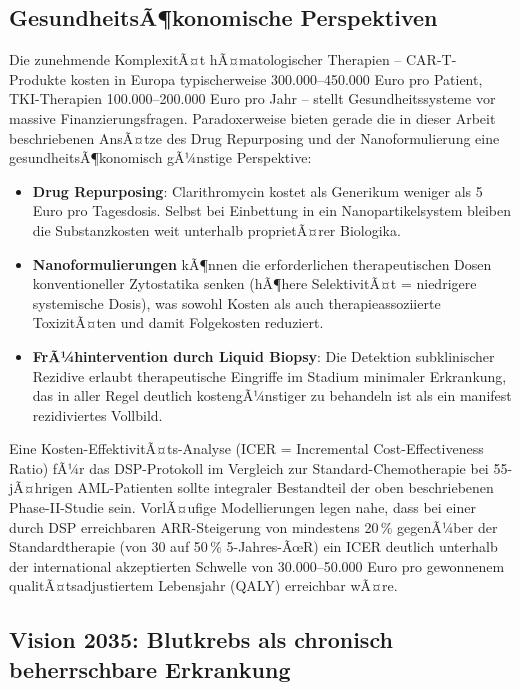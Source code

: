 ﻿\documentclass[12pt,a4paper]{article}
\theoremstyle{definition}
\begin{document}
\subsection{GesundheitsÃ¶konomische Perspektiven}

Die zunehmende KomplexitÃ¤t hÃ¤matologischer Therapien -- CAR-T-Produkte kosten
in Europa typischerweise 300.000--450.000 Euro pro Patient, TKI-Therapien
100.000--200.000 Euro pro Jahr -- stellt Gesundheitssysteme vor massive
Finanzierungsfragen. Paradoxerweise bieten gerade die in dieser Arbeit
beschriebenen AnsÃ¤tze des Drug Repurposing und der Nanoformulierung eine
gesundheitsÃ¶konomisch gÃ¼nstige Perspektive:

\begin{itemize}
  \item \textbf{Drug Repurposing}: Clarithromycin kostet als Generikum weniger als
        5 Euro pro Tagesdosis. Selbst bei Einbettung in ein Nanopartikelsystem
        bleiben die Substanzkosten weit unterhalb proprietÃ¤rer Biologika.
  \item \textbf{Nanoformulierungen} kÃ¶nnen die erforderlichen therapeutischen
        Dosen konventioneller Zytostatika senken (hÃ¶here SelektivitÃ¤t = niedrigere
        systemische Dosis), was sowohl Kosten als auch therapieassoziierte ToxizitÃ¤ten
        und damit Folgekosten reduziert.
  \item \textbf{FrÃ¼hintervention durch Liquid Biopsy}: Die Detektion subklinischer
        Rezidive erlaubt therapeutische Eingriffe im Stadium minimaler Erkrankung,
        das in aller Regel deutlich kostengÃ¼nstiger zu behandeln ist als ein manifest
        rezidiviertes Vollbild.
\end{itemize}

Eine Kosten-EffektivitÃ¤ts-Analyse (ICER = Incremental Cost-Effectiveness Ratio) fÃ¼r
das DSP-Protokoll im Vergleich zur Standard-Chemotherapie bei 55-jÃ¤hrigen AML-Patienten
sollte integraler Bestandteil der oben beschriebenen Phase-II-Studie sein. VorlÃ¤ufige
Modellierungen legen nahe, dass bei einer durch DSP erreichbaren ARR-Steigerung von
mindestens 20\,\% gegenÃ¼ber der Standardtherapie (von 30 auf 50\,\% 5-Jahres-ÃœR)
ein ICER deutlich unterhalb der international akzeptierten Schwelle von 30.000--50.000
Euro pro gewonnenem qualitÃ¤tsadjustiertem Lebensjahr (QALY) erreichbar wÃ¤re.

\subsection{Vision 2035: Blutkrebs als chronisch beherrschbare Erkrankung}
\end{document}
